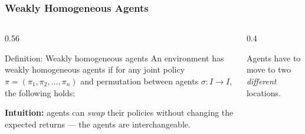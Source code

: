 \begin{frame}
\frametitle{Weakly Homogeneous Agents}

\begin{columns}[T,onlytextwidth]

\begin{column}{0.56\textwidth}
\begin{block}{Definition: Weakly homogeneous agents}
\small
An environment has weakly homogeneous agents if for any joint policy
$\pi = (\pi_1, \pi_2, \ldots, \pi_n)$
and permutation between agents $\sigma : I \to I$, the following holds:
\begin{center}
\end{center}
\end{block}

\vspace{0.6em}
{\small
\textbf{Intuition:} agents can \emph{swap} their policies without changing
the expected returns --- the agents are interchangeable.
}
\end{column}

\begin{column}{0.4\textwidth}
\centering
{}

\vspace{0.4em}
{\small Agents have to move to two \emph{different} locations.}
\end{column}

\end{columns}

\end{frame}

